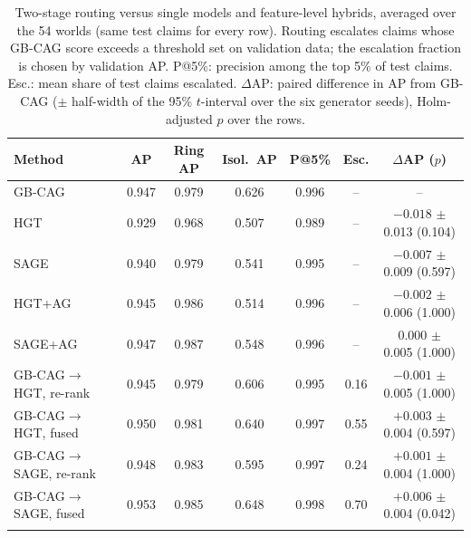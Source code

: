 \begin{table}[h]
\caption{Two-stage routing versus single models and feature-level hybrids, averaged over the 54 worlds (same test claims for every row). Routing escalates claims whose GB-CAG score exceeds a threshold set on validation data; the escalation fraction is chosen by validation AP. P@5\%: precision among the top 5\% of test claims. Esc.: mean share of test claims escalated. $\Delta$AP: paired difference in AP from GB-CAG ($\pm$ half-width of the 95\% $t$-interval over the six generator seeds), Holm-adjusted $p$ over the rows.}\label{tab:cascade}
\scriptsize
\setlength{\tabcolsep}{2.5pt}
\begin{tabular}{@{}lcccccc@{}}
\toprule
Method & AP & Ring AP & Isol.\ AP & P@5\% & Esc. & $\Delta$AP ($p$) \\
\midrule
GB-CAG & 0.947 & 0.979 & 0.626 & 0.996 & -- & -- \\
HGT & 0.929 & 0.968 & 0.507 & 0.989 & -- & $-0.018$ $\pm$ 0.013 (0.104) \\
SAGE & 0.940 & 0.979 & 0.541 & 0.995 & -- & $-0.007$ $\pm$ 0.009 (0.597) \\
\midrule
HGT+AG & 0.945 & 0.986 & 0.514 & 0.996 & -- & $-0.002$ $\pm$ 0.006 (1.000) \\
SAGE+AG & 0.947 & 0.987 & 0.548 & 0.996 & -- & $0.000$ $\pm$ 0.005 (1.000) \\
\midrule
GB-CAG$\to$HGT, re-rank & 0.945 & 0.979 & 0.606 & 0.995 & 0.16 & $-0.001$ $\pm$ 0.005 (1.000) \\
GB-CAG$\to$HGT, fused & 0.950 & 0.981 & 0.640 & 0.997 & 0.55 & $+0.003$ $\pm$ 0.004 (0.597) \\
GB-CAG$\to$SAGE, re-rank & 0.948 & 0.983 & 0.595 & 0.997 & 0.24 & $+0.001$ $\pm$ 0.004 (1.000) \\
GB-CAG$\to$SAGE, fused & 0.953 & 0.985 & 0.648 & 0.998 & 0.70 & $+0.006$ $\pm$ 0.004 (0.042) \\
\botrule
\end{tabular}
\end{table}